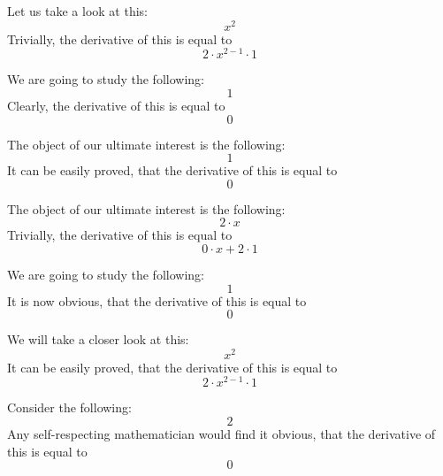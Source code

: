 \documentclass{article}
\begin{document}
Let us take a look at this:
\begin{equation}
x ^{2 } 
\end{equation}
Trivially, the derivative of this is equal to
\begin{equation}
2 \cdot x ^{2 - 1 } \cdot 1 
\end{equation}

We are going to study the following:
\begin{equation}
1 
\end{equation}
Clearly, the derivative of this is equal to
\begin{equation}
0 
\end{equation}

The object of our ultimate interest is the following:
\begin{equation}
1 
\end{equation}
It can be easily proved, that the derivative of this is equal to
\begin{equation}
0 
\end{equation}

The object of our ultimate interest is the following:
\begin{equation}
2 \cdot x 
\end{equation}
Trivially, the derivative of this is equal to
\begin{equation}
0 \cdot x + 2 \cdot 1 
\end{equation}

We are going to study the following:
\begin{equation}
1 
\end{equation}
It is now obvious, that the derivative of this is equal to
\begin{equation}
0 
\end{equation}

We will take a closer look at this:
\begin{equation}
x ^{2 } 
\end{equation}
It can be easily proved, that the derivative of this is equal to
\begin{equation}
2 \cdot x ^{2 - 1 } \cdot 1 
\end{equation}

Consider the following:
\begin{equation}
2 
\end{equation}
Any self-respecting mathematician would find it obvious, that the derivative of this is equal to
\begin{equation}
0 
\end{equation}
\end{document}
